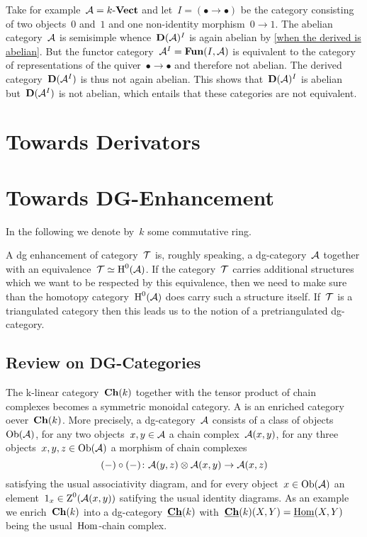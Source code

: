 \documentclass[a4paper,10pt]{scrartcl}
\begin{document}
Take for example~$\mathcal{A} = k\text{-}\mathbf{Vect}$ and let~$I = (\bullet \to \bullet)$ be the category consisting of two objects~$0$ and~$1$ and one non-identity morphism~$0 \to 1$.
The abelian category~$\mathcal{A}$ is semisimple whence~$\mathbf{D}(\mathcal{A})^I$ is again abelian by \cref{when the derived is abelian}.
But the functor category~$\mathcal{A}^I = \mathbf{Fun}(I, \mathcal{A})$ is equivalent to the category of representations of the quiver~$\bullet \to \bullet$ and therefore not abelian.
The derived category~$\mathbf{D}(\mathcal{A}^I)$ is thus not again abelian.
This shows that~$\mathbf{D}(\mathcal{A})^I$ is abelian but~$\mathbf{D}(\mathcal{A}^I)$ is not abelian, which entails that these categories are not equivalent.





\section{Towards Derivators}






\section{Towards DG-Enhancement}

In the following we denote by~$k$ some commutative ring.

A dg enhancement of category~$\mathcal{T}$ is, roughly speaking, a dg-category~$\mathcal{A}$ together with an equivalence~$\mathcal{T} \simeq \operatorname{H}^0(\mathcal{A})$.
If the category~$\mathcal{T}$ carries additional structures which we want to be respected by this equivalence, then we need to make sure than the homotopy category~$\operatorname{H}^0(\mathcal{A})$ does carry such a structure itself.
If~$\mathcal{T}$ is a triangulated category then this leads us to the notion of a pretriangulated dg-category.



\subsection{Review on DG-Categories}

The k-linear category~$\mathbf{Ch}(k)$ together with the tensor product of chain complexes becomes a symmetric monoidal category.
A  is an enriched category oever~$\mathbf{Ch}(k)$.
More precisely, a dg-category~$\mathcal{A}$ consists of a class of objects~$\operatorname{Ob}(\mathcal{A})$, for any two objects~$x, y \in \mathcal{A}$ a chain complex~$\mathcal{A}(x,y)$, for any three objects~$x, y, z \in \operatorname{Ob}(\mathcal{A})$ a morphism of chain complexes
\[
  (-) \circ (-)
  \colon
  \mathcal{A}(y,z) \otimes \mathcal{A}(x,y)
  \to
  \mathcal{A}(x,z)
\]
satisfying the usual associativity diagram, and for every object~$x \in \operatorname{Ob}(\mathcal{A})$ an element~$1_x \in \operatorname{Z}^0(\mathcal{A}(x,y))$ satifying the usual identity diagrams.
As an example we enrich~$\mathbf{Ch}(k)$ into a dg-category~$\underline{\mathbf{Ch}}(k)$ with~$\underline{\mathbf{Ch}}(k)(X,Y) = \underline{\operatorname{Hom}}(X,Y)$ being the usual~$\operatorname{Hom}$-chain complex.
\end{document}
